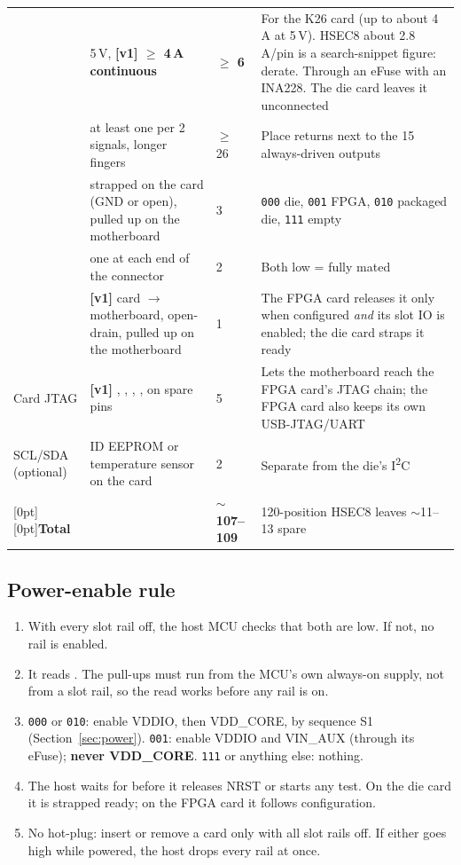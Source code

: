 \documentclass[10pt,a4paper]{article}
\begin{document}
{\begin{longtable}{@{}P{2.9cm}P{6.3cm}P{1.3cm}P{5.4cm}@{}}
 & 5\,V, \textbf{[v1] $\ge$ 4\,A continuous} & \textbf{$\ge$ 6} & For the K26 card (up to about 4\,A at 5\,V). HSEC8 about 2.8\,A/pin is a search-snippet figure: derate. Through an eFuse with an INA228. The die card leaves it unconnected \\
 & at least one per 2 signals, longer fingers & $\ge$ 26 & Place returns next to the 15 always-driven outputs \\
 & strapped on the card (GND or open), pulled up on the motherboard & 3 & \texttt{000} die, \texttt{001} FPGA, \texttt{010} packaged die, \texttt{111} empty \\
 & one at each end of the connector & 2 & Both low = fully mated \\
 & \textbf{[v1]} card $\to$ motherboard, open-drain, pulled up on the motherboard & 1 & The FPGA card releases it only when configured \emph{and} its slot IO is enabled; the die card straps it ready \\
Card JTAG & \textbf{[v1]} , , , ,  on spare pins & 5 & Lets the motherboard reach the FPGA card's JTAG chain; the FPGA card also keeps its own USB-JTAG/UART \\
 SCL/SDA (optional) & ID EEPROM or temperature sensor on the card & 2 & Separate from the die's I\textsuperscript{2}C \\
[0pt][0pt]\textbf{Total} & & \textbf{$\sim$107--109} & 120-position HSEC8 leaves $\sim$11--13 spare \\
\bottomrule
\end{longtable}\addtocounter{table}{-1}}

\subsection{Power-enable rule}\label{sec:cardid}
\begin{enumerate}
\item With every slot rail off, the host MCU checks that both  are low. If not, no rail is enabled.
\item It reads . The pull-ups must run from the MCU's own always-on supply, not from a slot rail, so the read works before any rail is on.
\item \texttt{000} or \texttt{010}: enable VDDIO, then VDD\_CORE, by sequence S1 (Section~\ref{sec:power}). \texttt{001}: enable VDDIO and VIN\_AUX (through its eFuse); \textbf{never VDD\_CORE}. \texttt{111} or anything else: nothing.
\item The host waits for  before it releases NRST or starts any test. On the die card it is strapped ready; on the FPGA card it follows configuration.
\item No hot-plug: insert or remove a card only with all slot rails off. If either  goes high while powered, the host drops every rail at once.
\end{enumerate}
\end{document}
